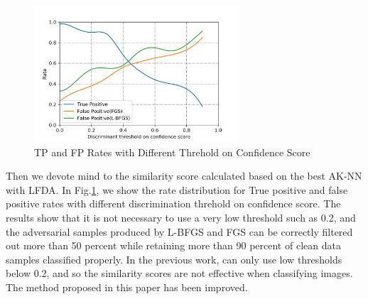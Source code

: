 \documentclass{ieeeaccess}
\begin{document}
\begin{figure}
	\centering
	\includegraphics[width=3in,height=2in]{fig//111.jpg}
	\caption{TP and FP Rates with Different Threhold on Confidence Score}
	\label{TF Rate}
\end{figure}
Then we devote mind to the similarity score calculated based on the best AK-NN with LFDA. In Fig.\ref{TF Rate}, we show the rate distribution for True positive and false positive rates with different discrimination threhold on confidence score. The results show that it is not necessary to use a very low threshold such as 0.2, and the adversarial samples produced by L-BFGS and FGS can be correctly filtered out more than 50 percent while retaining more than 90 percent of clean data samples classified properly. In the previous work, can only use low thresholds below 0.2, and so the similarity scores are not effective when classifying images. The method proposed in this paper has been improved.
\end{document}
